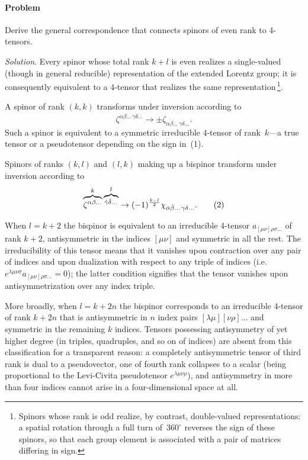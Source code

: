 \paragraph{Problem}

Derive the general correspondence that connects spinors of even rank to 4-tensors.

\emph{Solution}. Every spinor whose total rank $k + l$ is even realizes a single-valued (though in general reducible) representation of the extended Lorentz group; it is consequently equivalent to a 4-tensor that realizes the same representation\,\footnote{Spinors whose rank is odd realize, by contrast, double-valued representations: a spatial rotation through a full turn of~$360^\circ$ reverses the sign of these spinors, so that each group element is associated with a pair of matrices differing in sign.}.

A spinor of rank $(k, k)$ transforms under inversion according to
\[
\zeta^{\alpha\beta\ldots\,\dot\gamma\dot\delta\ldots} \to \pm\zeta_{\dot\alpha\dot\beta\ldots\,\gamma\delta\ldots}.
\]
Such a spinor is equivalent to a symmetric irreducible 4-tensor of rank~$k$---a true tensor or a pseudotensor depending on the sign in~(1).

Spinors of ranks $(k, l)$ and $(l, k)$ making up a bispinor transform under inversion according to
\[
\overbrace{\zeta^{\alpha\beta\ldots}}^{k}\overbrace{\vphantom{\zeta}^{\dot\gamma\dot\delta\ldots}}^{l} \to (-1)^{\frac{k-l}{2}}\chi_{\dot\alpha\dot\beta\ldots\,\gamma\delta\ldots}.
\tag{2}
\]

When $l = k + 2$ the bispinor is equivalent to an irreducible 4-tensor $a_{[\mu\nu]\rho\sigma\ldots}$ of rank $k+2$, antisymmetric in the indices $[\mu\nu]$ and symmetric in all the rest. The irreducibility of this tensor means that it vanishes upon contraction over any pair of indices and upon dualization with respect to any triple of indices (i.e.\ $e^{\lambda\mu\nu\sigma}a_{[\mu\nu]\rho\sigma\ldots} = 0$); the latter condition signifies that the tensor vanishes upon antisymmetrization over any index triple.

More broadly, when $l = k + 2n$ the bispinor corresponds to an irreducible 4-tensor of rank $k + 2n$ that is antisymmetric in $n$ index pairs $[\lambda\mu][\nu\rho]\ldots$ and symmetric in the remaining $k$ indices. Tensors possessing antisymmetry of yet higher degree (in triples, quadruples, and so on of indices) are absent from this classification for a transparent reason: a completely antisymmetric tensor of third rank is dual to a pseudovector, one of fourth rank collapses to a scalar (being proportional to the Levi-Civita pseudotensor $e^{\lambda\mu\nu\rho}$), and antisymmetry in more than four indices cannot arise in a four-dimensional space at all.
